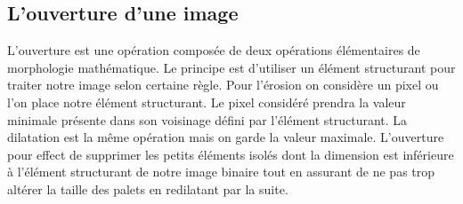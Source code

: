 \documentclass{article}
\begin{document}
\subsection{L'ouverture d'une image}
	L'ouverture est une opération composée de deux opérations élémentaires de morphologie mathématique. Le principe est d'utiliser un élément structurant pour traiter notre image selon certaine règle.
	Pour l'érosion on considère un pixel ou l'on place notre élément structurant. Le pixel considéré prendra la valeur minimale présente dans son voisinage défini par l'élément structurant.
	La dilatation est la même opération mais on garde la valeur maximale.
	L'ouverture pour effect de supprimer les petits éléments isolés dont la dimension est inférieure à l'élément structurant de notre image binaire tout en assurant de ne pas trop altérer la taille des palets en redilatant par la suite.
\end{document}
